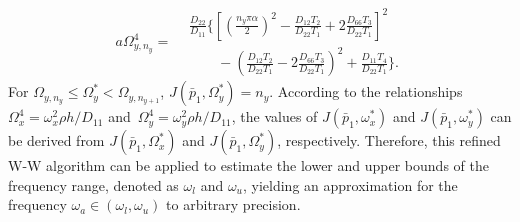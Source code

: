\documentclass[preprint,12pt]{elsarticle}
\begin{document}
%
\begin{equation}\label{eq:J_simpy}
	a\Omega^4_{y,n_y}= 
		\begin{aligned}
			&\frac{D_{22}}{D_{11}}\Biggl\{\left[\left(\frac{n_y\pi\alpha}{2}\right)^2 - \frac{D_{12}T_2}{D_{22}T_1} + 2 \frac{D_{66}T_3}{D_{22}T_1}\right]^2 \\ 
			&\qquad - \left(\frac{D_{12}T_2}{D_{22}T_1} - 2 \frac{D_{66}T_3}{D_{22}T_1}\right)^2
			+ \frac{D_{11}T_4}{D_{22}T_1}\Biggr\}.
		\end{aligned}
\end{equation}
%
For $\Omega_{y,n_y} \leq \Omega_y^* < \Omega_{y,n_{y+1}}$, $J(\bar{p}_1, \Omega_y^*) = n_y$.
According to the relationships 
$\Omega^4_x = {{\omega_x^2 \rho h}/{D_{11}}}$ and\ $\Omega^4_y = {{\omega_y^2 \rho h}/{D_{11}}}$, 
the values of $J(\bar{p}_1, \omega_x^*)$ and $J(\bar{p}_1, \omega_y^*)$ can be derived from $J(\bar{p}_1, \Omega_x^*)$ and $J(\bar{p}_1, \Omega_y^*)$, respectively. Therefore, this refined W-W algorithm can be applied to estimate the lower and upper bounds of the frequency range, denoted as $\omega_l$ and $\omega_u$, yielding an approximation for the frequency $\omega_a \in (\omega_l, \omega_u)$ to arbitrary precision.
\end{document}
